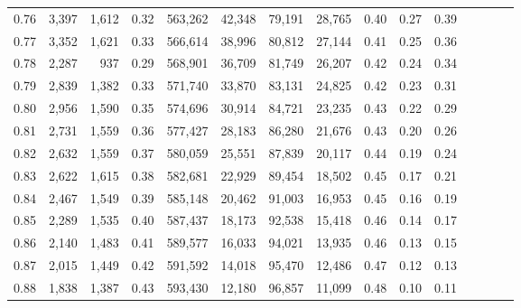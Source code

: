 \begin{tabular}{rrrcrrrrrrrrrrr}
0.76 &   3,397 &  1,612 &                                       0.32 &  563,262 &   42,348 &   79,191 &   28,765 &  0.40 &  0.27 &                         0.39 \\
0.77 &   3,352 &  1,621 &                                       0.33 &  566,614 &   38,996 &   80,812 &   27,144 &  0.41 &  0.25 &                         0.36 \\
0.78 &   2,287 &    937 &                                       0.29 &  568,901 &   36,709 &   81,749 &   26,207 &  0.42 &  0.24 &                         0.34 \\
0.79 &   2,839 &  1,382 &                                       0.33 &  571,740 &   33,870 &   83,131 &   24,825 &  0.42 &  0.23 &                         0.31 \\
0.80 &   2,956 &  1,590 &                                       0.35 &  574,696 &   30,914 &   84,721 &   23,235 &  0.43 &  0.22 &                         0.29 \\
0.81 &   2,731 &  1,559 &                                       0.36 &  577,427 &   28,183 &   86,280 &   21,676 &  0.43 &  0.20 &                         0.26 \\
0.82 &   2,632 &  1,559 &                                       0.37 &  580,059 &   25,551 &   87,839 &   20,117 &  0.44 &  0.19 &                         0.24 \\
0.83 &   2,622 &  1,615 &                                       0.38 &  582,681 &   22,929 &   89,454 &   18,502 &  0.45 &  0.17 &                         0.21 \\
0.84 &   2,467 &  1,549 &                                       0.39 &  585,148 &   20,462 &   91,003 &   16,953 &  0.45 &  0.16 &                         0.19 \\
0.85 &   2,289 &  1,535 &                                       0.40 &  587,437 &   18,173 &   92,538 &   15,418 &  0.46 &  0.14 &                         0.17 \\
0.86 &   2,140 &  1,483 &                                       0.41 &  589,577 &   16,033 &   94,021 &   13,935 &  0.46 &  0.13 &                         0.15 \\
0.87 &   2,015 &  1,449 &                                       0.42 &  591,592 &   14,018 &   95,470 &   12,486 &  0.47 &  0.12 &                         0.13 \\
0.88 &   1,838 &  1,387 &                                       0.43 &  593,430 &   12,180 &   96,857 &   11,099 &  0.48 &  0.10 &                         0.11 \\

\end{tabular}
